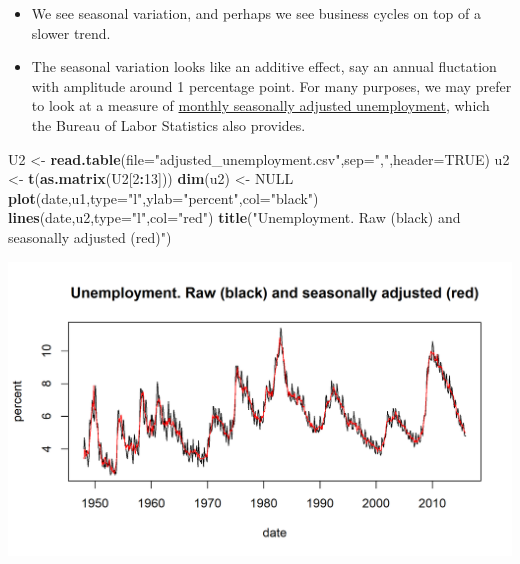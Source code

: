 \documentclass[]{article}
\newenvironment{Shaded}{\begin{snugshade}}{\end{snugshade}}
\newcommand{\KeywordTok}[1]{\textcolor[rgb]{0.13,0.29,0.53}{\textbf{#1}}}
\newcommand{\DataTypeTok}[1]{\textcolor[rgb]{0.13,0.29,0.53}{#1}}
\newcommand{\DecValTok}[1]{\textcolor[rgb]{0.00,0.00,0.81}{#1}}
\newcommand{\StringTok}[1]{\textcolor[rgb]{0.31,0.60,0.02}{#1}}
\newcommand{\OtherTok}[1]{\textcolor[rgb]{0.56,0.35,0.01}{#1}}
\newcommand{\OperatorTok}[1]{\textcolor[rgb]{0.81,0.36,0.00}{\textbf{#1}}}
\newcommand{\NormalTok}[1]{#1}
\begin{document}
\begin{itemize}
\item
  We see seasonal variation, and perhaps we see business cycles on top
  of a slower trend.
\item
  The seasonal variation looks like an additive effect, say an annual
  fluctation with amplitude around 1 percentage point. For many
  purposes, we may prefer to look at a measure of
  \href{http://data.bls.gov/timeseries/LNS14000000}{monthly seasonally
  adjusted unemployment}, which the Bureau of Labor Statistics also
  provides.
\end{itemize}

\begin{Shaded}
\begin{Highlighting}[]
\NormalTok{U2 <-}\StringTok{ }\KeywordTok{read.table}\NormalTok{(}\DataTypeTok{file=}\StringTok{"adjusted_unemployment.csv"}\NormalTok{,}\DataTypeTok{sep=}\StringTok{","}\NormalTok{,}\DataTypeTok{header=}\OtherTok{TRUE}\NormalTok{)}
\NormalTok{u2 <-}\StringTok{ }\KeywordTok{t}\NormalTok{(}\KeywordTok{as.matrix}\NormalTok{(U2[}\DecValTok{2}\OperatorTok{:}\DecValTok{13}\NormalTok{]))}
\KeywordTok{dim}\NormalTok{(u2) <-}\StringTok{ }\OtherTok{NULL}
\KeywordTok{plot}\NormalTok{(date,u1,}\DataTypeTok{type=}\StringTok{"l"}\NormalTok{,}\DataTypeTok{ylab=}\StringTok{"percent"}\NormalTok{,}\DataTypeTok{col=}\StringTok{"black"}\NormalTok{)}
\KeywordTok{lines}\NormalTok{(date,u2,}\DataTypeTok{type=}\StringTok{"l"}\NormalTok{,}\DataTypeTok{col=}\StringTok{"red"}\NormalTok{)}
\KeywordTok{title}\NormalTok{(}\StringTok{"Unemployment. Raw (black) and seasonally adjusted (red)"}\NormalTok{)}
\end{Highlighting}
\end{Shaded}

\begin{center}\includegraphics{figure/intro-data_adj-1} \end{center}
\end{document}
